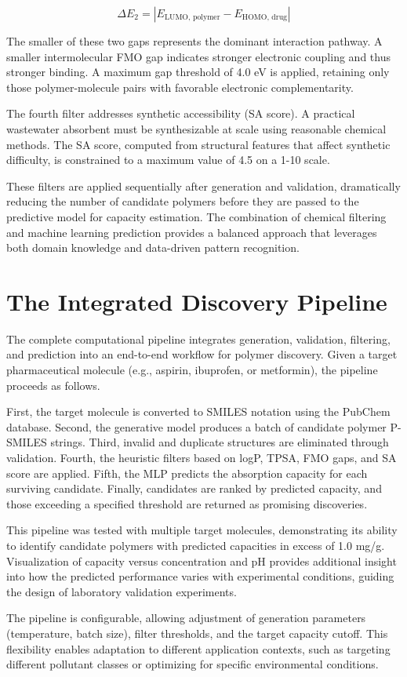 \begin{equation}
	\Delta E_2 = |E_{\text{LUMO, polymer}} - E_{\text{HOMO, drug}}|
\end{equation}

The smaller of these two gaps represents the dominant interaction pathway. A smaller intermolecular FMO gap indicates stronger electronic coupling and thus stronger binding. A maximum gap threshold of 4.0 eV is applied, retaining only those polymer-molecule pairs with favorable electronic complementarity.

The fourth filter addresses synthetic accessibility (SA score). A practical wastewater absorbent must be synthesizable at scale using reasonable chemical methods. The SA score, computed from structural features that affect synthetic difficulty, is constrained to a maximum value of 4.5 on a 1-10 scale.

These filters are applied sequentially after generation and validation, dramatically reducing the number of candidate polymers before they are passed to the predictive model for capacity estimation. The combination of chemical filtering and machine learning prediction provides a balanced approach that leverages both domain knowledge and data-driven pattern recognition.

\section{The Integrated Discovery Pipeline}
\label{sec:discovery_pipeline}

The complete computational pipeline integrates generation, validation, filtering, and prediction into an end-to-end workflow for polymer discovery. Given a target pharmaceutical molecule (e.g., aspirin, ibuprofen, or metformin), the pipeline proceeds as follows.

First, the target molecule is converted to SMILES notation using the PubChem database. Second, the generative model produces a batch of candidate polymer P-SMILES strings. Third, invalid and duplicate structures are eliminated through validation. Fourth, the heuristic filters based on logP, TPSA, FMO gaps, and SA score are applied. Fifth, the MLP predicts the absorption capacity for each surviving candidate. Finally, candidates are ranked by predicted capacity, and those exceeding a specified threshold are returned as promising discoveries.

This pipeline was tested with multiple target molecules, demonstrating its ability to identify candidate polymers with predicted capacities in excess of 1.0 mg/g. Visualization of capacity versus concentration and pH provides additional insight into how the predicted performance varies with experimental conditions, guiding the design of laboratory validation experiments.

The pipeline is configurable, allowing adjustment of generation parameters (temperature, batch size), filter thresholds, and the target capacity cutoff. This flexibility enables adaptation to different application contexts, such as targeting different pollutant classes or optimizing for specific environmental conditions.

